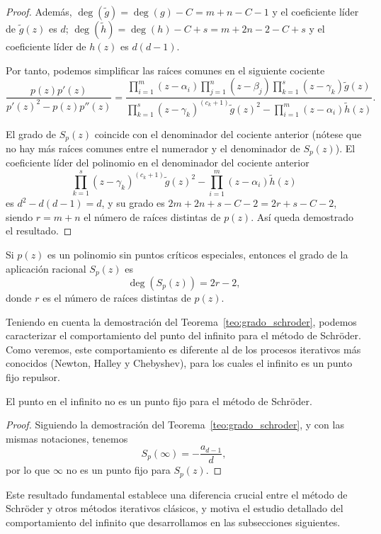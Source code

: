 \begin{proof}
Además, $\deg(\tilde{g})=\deg(g)-C=m+n-C-1$ y el coeficiente líder de $\tilde{g}(z)$ es $d$; $\deg(\tilde{h})=\deg(h)-C+s=m+2n-2-C+s$ y el coeficiente líder de $h(z)$ es $d(d-1)$.

Por tanto, podemos simplificar las raíces comunes en el siguiente cociente
$$
\frac{p(z)p'(z)}{p'(z)^2- p(z)p''(z)}=\dfrac{\prod_{i=1}^m(z-\alpha_i)\prod_{j=1}^n(z-\beta_j) \prod_{k=1}^s(z-\gamma_k) \tilde{g}(z)}
{\prod_{k=1}^s(z-\gamma_k)^{(c_k+1)} \tilde{g}(z)^2-\prod_{i=1}^m(z-\alpha_i)\tilde{h}(z)}.
$$

El grado de $S_p(z)$ coincide con el denominador del cociente anterior (nótese que no hay más raíces comunes entre el numerador y el denominador de $S_p(z)$). El coeficiente líder del polinomio en el denominador del cociente anterior
$$
\prod_{k=1}^s(z-\gamma_k)^{(c_k+1)} \tilde{g}(z)^2-\prod_{i=1}^m(z-\alpha_i)\tilde{h}(z)
$$
es $d^2-d(d-1)=d$, y su grado es
$2m+2n+s-C-2 =2r+s-C-2$, siendo $r=m+n$ el número de raíces distintas de $p(z)$. Así queda demostrado el resultado.
\end{proof}

\begin{corolario}\label{cor:grado_sin_criticos}
Si $p(z)$ es un polinomio sin puntos críticos especiales, entonces el grado de la aplicación racional $S_{p}(z)$ es
$$\deg(S_{p}(z))=2r-2,$$
donde $r$ es el número de raíces distintas de $p(z)$.
\end{corolario}

Teniendo en cuenta la demostración del Teorema~\ref{teo:grado_schroder}, podemos caracterizar el comportamiento del punto del infinito para el método de Schröder. Como veremos, este comportamiento es diferente al de los procesos iterativos más conocidos (Newton, Halley y Chebyshev), para los cuales el infinito es un punto fijo repulsor.

\begin{corolario}\label{cor:infinito_no_fijo}
El punto en el infinito no es un punto fijo para el método de Schröder.
\end{corolario}

\begin{proof}
Siguiendo la demostración del Teorema~\ref{teo:grado_schroder}, y con las mismas notaciones, tenemos
$$
S_p(\infty)=-\frac{a_{d-1}}{d},
$$
por lo que $\infty$ no es un punto fijo para $S_p(z)$.
\end{proof}

Este resultado fundamental establece una diferencia crucial entre el método de Schröder y otros métodos iterativos clásicos, y motiva el estudio detallado del comportamiento del infinito que desarrollamos en las subsecciones siguientes.

